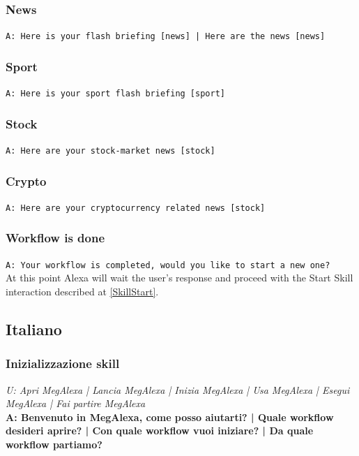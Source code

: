 \subsubsection{News}
\texttt{A: Here is your flash briefing [news] | Here are the news [news]}

\subsubsection{Sport}
\texttt{A: Here is your sport flash briefing [sport]}

\subsubsection{Stock}  
\texttt{A: Here are your stock-market news [stock]}

\subsubsection{Crypto}   
\texttt{A: Here are your cryptocurrency related news [stock]}

\subsubsection{Workflow is done}
\texttt{A: Your workflow is completed, would you like to start a new one?}\\
At this point Alexa will wait the user's response and proceed with the Start Skill interaction described at \ref{SkillStart}.

\subsection{Italiano}
\subsubsection{Inizializzazione skill} \label{InizializzazioneSkill}
\textit{U: Apri MegAlexa | Lancia MegAlexa | Inizia MegAlexa | Usa MegAlexa | Esegui MegAlexa | Fai partire MegAlexa}\\
\textbf{A: Benvenuto in MegAlexa, come posso aiutarti? | Quale workflow desideri aprire? | Con quale workflow vuoi iniziare? | Da quale workflow partiamo?}

